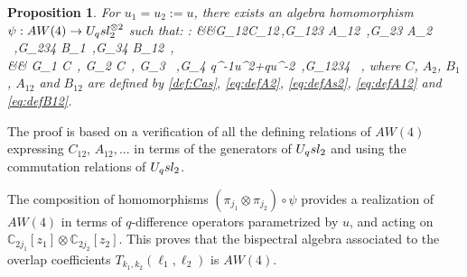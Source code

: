\documentclass[11pt]{amsart}
\numberwithin{equation}{section}
\newtheorem{prop}[thm]{Proposition}
\numberwithin{equation}{section}
\begin{document}
\begin{prop} \label{prop:wAW2} 
For $u_1=u_2:=u$, there exists an algebra homomorphism $\psi: AW(4) \rightarrow U_q sl_2^{\otimes 2}$ such that:
	\beqa
\psi:	&&G_{12}\mapsto C_{12}\,,\quad G_{123} \mapsto  A_{12}\ ,\quad G_{23} \mapsto  A_2 \ ,\quad G_{234} \mapsto  B_1\ ,\quad G_{34} \mapsto  B_{12}\ , \\
	&& G_{1} \mapsto C\ , \quad G_2 \otimes C\ , \quad G_3 \mapsto  \alpha\ ,\quad G_4 \mapsto q^{-1}u^2+qu^{-2}\ ,\quad G_{1234} \mapsto \beta\ , \nonumber
	\eeqa
	where $C$, $A_2$, $B_1$, $A_{12}$ and $B_{12}$ are defined by \eqref{def:Cas}, \eqref{eq:defA2}, \eqref{eq:defAs2}, \eqref{eq:defA12} and \eqref{eq:defB12}.
\end{prop}
\proof The proof is based on a verification of all the defining relations of $AW(4)$ expressing  $C_{12}$, $A_{12},...$ in terms of the generators of $U_q sl_2$ and using the commutation relations of $U_q sl_2$.  \endproof

The composition of homomorphisms $(\pi_{j_1}\otimes \pi_{j_2}) \circ \psi$ provides a realization of $AW(4)$ in terms of $q$-difference operators parametrized by $u$, and acting on $\mathbb{C}_{2j_1}[z_1]\otimes \mathbb{C}_{2j_2}[z_2]$. This proves that the bispectral algebra associated to the overlap coefficients $T_{k_1,k_2}(\ell_1,\ell_2)$ is $AW(4)$.
\end{document}
